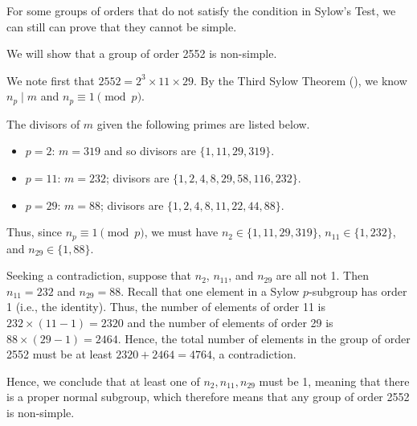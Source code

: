 For some groups of orders that do not satisfy the condition in Sylow's Test, we can still can prove that they cannot be simple.

\begin{example}
    We will show that a group of order 2552 is non-simple.

    We note first that $2552 = 2^3 \times 11 \times 29$. By the Third Sylow Theorem (), we know $n_p \mid m$ and $n_p \equiv 1 \pmod p$.

    The divisors of $m$ given the following primes are listed below.
    \begin{itemize}
        \item $p = 2$: $m = 319$ and so divisors are $\{1, 11, 29, 319\}$.
        \item $p = 11$: $m = 232$; divisors are $\{1, 2, 4, 8, 29, 58, 116, 232\}$.
        \item $p = 29$: $m = 88$; divisors are $\{1, 2, 4, 8, 11, 22, 44, 88\}$.
    \end{itemize}
    Thus, since $n_p \equiv 1 \pmod p$, we must have $n_2 \in \{1, 11, 29, 319\}$, $n_{11} \in \{1, 232\}$, and $n_{29} \in \{1, 88\}$.

    Seeking a contradiction, suppose that $n_2$, $n_{11}$, and $n_{29}$ are all not 1. Then $n_{11} = 232$ and $n_{29} = 88$. Recall that one element in a Sylow $p$-subgroup has order 1 (i.e., the identity). Thus, the number of elements of order 11 is $232 \times (11 - 1) = 2320$ and the number of elements of order 29 is $88 \times (29 - 1) = 2464$. Hence, the total number of elements in the group of order 2552 must be at least $2320 + 2464 = 4764$, a contradiction.

    Hence, we conclude that at least one of $n_2, n_{11}, n_{29}$ must be 1, meaning that there is a proper normal subgroup, which therefore means that any group of order 2552 is non-simple.
\end{example}

